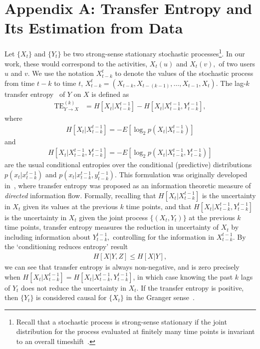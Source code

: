 \appendix

\section{Appendix A: Transfer Entropy and Its Estimation from Data}

Let $\{X_{t}\}$ and $\{ Y_{t}\}$ be two strong-sense stationary stochastic processes\footnote{Recall that a stochastic process is strong-sense stationary if the joint distribution for the process evaluated at finitely many time points is invariant to an overall timeshift~\cite{grimmett2001probability}.}. In our work, these would correspond to the activities, $X_{t}(u)$ and $X_{t}(v),$ of two users $u$ and $v$. We use the notation $X_{t-k}^{t}$ to denote the values of the stochastic process from time $t-k$ to time $t$, $X_{t-k}^{t} = (X_{t-k}, X_{t-(k-1)}, \ldots, X_{t - 1}, X_{t})$. The lag-$k$ transfer entropy~\cite{schreiber2000measuring} of $Y$ on $X$ is defined as 
\begin{align}
	\text{TE}_{Y \to X}^{(k)} &= H\left[X_{t} | X_{t-k}^{t-1}\right] - H\left[X_{t} | X_{t-k}^{t-1}, Y_{t-k}^{t-1}\right], \label{Eqn-TE}
\end{align}
where
\begin{align}
	H\left[X_{t} | X_{t-k}^{t-1}\right] = - E\left[ \log_{2} p(X_{t} | X_{t-k}^{t-1}) \right]
\end{align}
and 
\begin{align}
	H\left[X_{t} | X_{t-k}^{t-1}, Y_{t-k}^{t-1}\right] = - E\left[ \log_{2} p(X_{t} | X_{t-k}^{t-1}, Y_{t-k}^{t-1}) \right]
\end{align}
are the usual conditional entropies over the conditional (predictive) distributions $p(x_{t} | x_{t-k}^{t-1})$ and $p(x_{t} | x_{t-k}^{t-1}, y_{t-k}^{t-1})$. This formulation was originally developed in~\cite{schreiber2000measuring}, where transfer entropy was proposed as an information theoretic measure of \emph{directed} information flow. Formally, recalling that $H\left[X_{t} | X_{t-k}^{t-1}\right]$ is the uncertainty in $X_{t}$ given its values at the previous $k$ time points, and that $H\left[X_{t} | X_{t-k}^{t-1}, Y_{t-k}^{t-1}\right]$ is the uncertainty in $X_{t}$ given the joint process $\{(X_{t}, Y_{t})\}$ at the previous $k$ time points, transfer entropy measures the reduction in uncertainty of $X_{t}$ by including information about $Y_{t-k}^{t-1},$ controlling for the information in $X_{t - k}^{t-1}$. By the `conditioning reduces entropy' result~\cite{cover2012elements}
\begin{align}
	H[X | Y, Z] \leq H[X | Y],
\end{align}
we can see that transfer entropy is always non-negative, and is zero precisely when $H\left[X_{t} | X_{t-k}^{t-1}\right] = H\left[X_{t} | X_{t-k}^{t-1}, Y_{t-k}^{t-1}\right]$, in which case knowing the past $k$ lags of $Y_{t}$ does not reduce the uncertainty in $X_{t}$. If the transfer entropy is positive, then $\{ Y_{t}\}$ is considered causal for $\{ X_{t}\}$ in the Granger sense~\cite{granger1963economic}.

